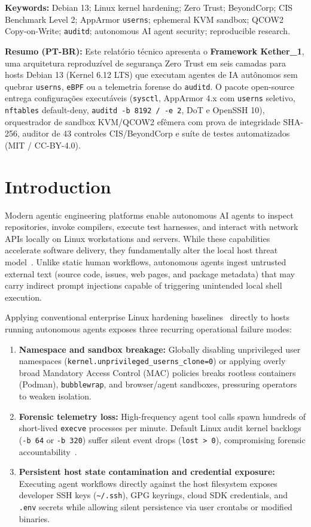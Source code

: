 \documentclass[11pt,a4paper]{article}
\newcommand{\code}[1]{\nolinkurl{#1}}
\begin{document}
\noindent\textbf{Keywords:} Debian 13; Linux kernel hardening; Zero Trust; BeyondCorp; CIS Benchmark Level 2; AppArmor \code{userns}; ephemeral KVM sandbox; QCOW2 Copy-on-Write; \code{auditd}; autonomous AI agent security; reproducible research.

\noindent\textbf{\small Resumo (PT-BR):} \small Este relat\'orio t\'ecnico apresenta o \textbf{Framework Kether\_1}, uma arquitetura reproduz\'ivel de seguran\c{c}a Zero Trust em seis camadas para hosts Debian 13 (Kernel 6.12 LTS) que executam agentes de IA aut\^onomos sem quebrar \code{userns}, \code{eBPF} ou a telemetria forense do \code{auditd}. O pacote open-source entrega configura\c{c}\~oes execut\'aveis (\code{sysctl}, AppArmor 4.x com \code{userns} seletivo, \code{nftables} default-deny, \code{auditd -b 8192 / -e 2}, DoT e OpenSSH 10), orquestrador de sandbox KVM/QCOW2 ef\^emera com prova de integridade SHA-256, auditor de 43 controles CIS/BeyondCorp e su\'ite de testes automatizados (MIT / CC-BY-4.0).

\section{Introduction}

Modern agentic engineering platforms enable autonomous AI agents to inspect repositories, invoke compilers, execute test harnesses, and interact with network APIs locally on Linux workstations and servers. While these capabilities accelerate software delivery, they fundamentally alter the local host threat model~\cite{owasp2025llm}. Unlike static human workflows, autonomous agents ingest untrusted external text (source code, issues, web pages, and package metadata) that may carry indirect prompt injections capable of triggering unintended local shell execution.

Applying conventional enterprise Linux hardening baselines~\cite{cis2024debian} directly to hosts running autonomous agents exposes three recurring operational failure modes:

\begin{enumerate}[leftmargin=1.5em, itemsep=2pt]
  \item \textbf{Namespace and sandbox breakage:} Globally disabling unprivileged user namespaces (\code{kernel.unprivileged_userns_clone=0}) or applying overly broad Mandatory Access Control (MAC) policies breaks rootless containers (Podman), \code{bubblewrap}, and browser/agent sandboxes, pressuring operators to weaken isolation.
  \item \textbf{Forensic telemetry loss:} High-frequency agent tool calls spawn hundreds of short-lived \code{execve} processes per minute. Default Linux audit kernel backlogs (\code{-b 64} or \code{-b 320}) suffer silent event drops (\code{lost > 0}), compromising forensic accountability~\cite{linuxaudit}.
  \item \textbf{Persistent host state contamination and credential exposure:} Executing agent workflows directly against the host filesystem exposes developer SSH keys (\code{~/.ssh}), GPG keyrings, cloud SDK credentials, and \code{.env} secrets while allowing silent persistence via user crontabs or modified binaries.
\end{enumerate}
\end{document}
